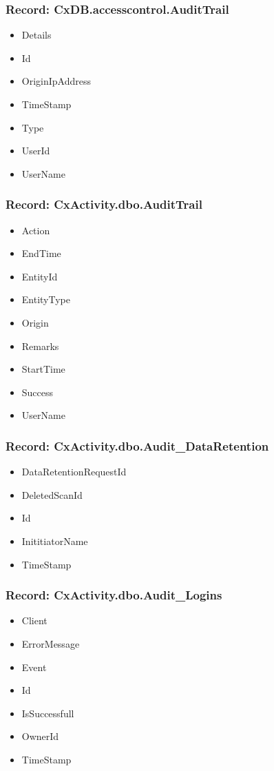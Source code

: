 \subsubsection{Record: CxDB.accesscontrol.AuditTrail}

\begin{itemize}
    \item Details
    \item Id
    \item OriginIpAddress
    \item TimeStamp
    \item Type
    \item UserId
    \item UserName
\end{itemize}


\subsubsection{Record: CxActivity.dbo.AuditTrail}
\begin{itemize}
    \item Action
    \item EndTime
    \item EntityId
    \item EntityType
    \item Origin
    \item Remarks
    \item StartTime
    \item Success
    \item UserName
\end{itemize}


\subsubsection{Record: CxActivity.dbo.Audit\_DataRetention}
\begin{itemize}
    \item DataRetentionRequestId
    \item DeletedScanId
    \item Id
    \item InititiatorName
    \item TimeStamp
\end{itemize}


\subsubsection{Record: CxActivity.dbo.Audit\_Logins}
\begin{itemize}
    \item Client
    \item ErrorMessage
    \item Event
    \item Id
    \item IsSuccessfull
    \item OwnerId
    \item TimeStamp
\end{itemize}

